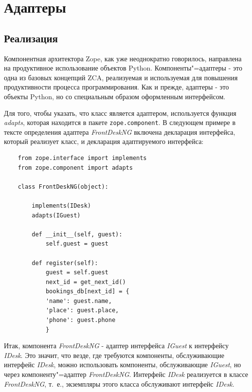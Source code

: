 \documentclass[a4paper,openany,twoside,draft]{book}
\providecommand*{\DUroletitlereference}[1]{\textsl{#1}}
\begin{document}
\chapter{Адаптеры%
  \label{id33}%
}


\section{Реализация%
  \label{id34}%
}

Компонентная архитектора Zope, как уже неоднократно говорилось, направлена на продуктивное использование объектов Python.  Компоненты"=адаптеры - это одна из базовых концепций ZCA, реализуемая и используемая для повышения продуктивности процесса программирования.  Как и прежде, адаптеры - это объекты Python, но со специальным образом оформленным интерфейсом.

Для того, чтобы указать, что класс является адаптером, используется функция \DUroletitlereference{adapts}, которая находится в пакете \texttt{zope.component}.  В следующем примере в тексте определения адаптера \DUroletitlereference{FrontDeskNG} включена декларация интерфейса, который реализует класс, и декларация адаптируемого интерфейса:

\begin{verbatim}
    from zope.interface import implements
    from zope.component import adapts

    class FrontDeskNG(object):

        implements(IDesk)
        adapts(IGuest)

        def __init__(self, guest):
            self.guest = guest

        def register(self):
            guest = self.guest
            next_id = get_next_id()
            bookings_db[next_id] = {
            'name': guest.name,
            'place': guest.place,
            'phone': guest.phone
            }
\end{verbatim}

Итак, компонента \DUroletitlereference{FrontDeskNG} - адаптер интерфейса \DUroletitlereference{IGuest} к интерфейсу \DUroletitlereference{IDesk}.  Это значит, что везде, где требуются компоненты, обслуживающие интерфейс \DUroletitlereference{IDesk}, можно использовать компоненты, обслуживающие \DUroletitlereference{IGuest}, но через компоненту"=адаптер \DUroletitlereference{FrontDeskNG}.  Интерфейс \DUroletitlereference{IDesk} реализуется в классе \DUroletitlereference{FrontDeskNG}, т.~е., экземпляры этого класса обслуживают интерфейс \DUroletitlereference{IDesk}.
\end{document}
